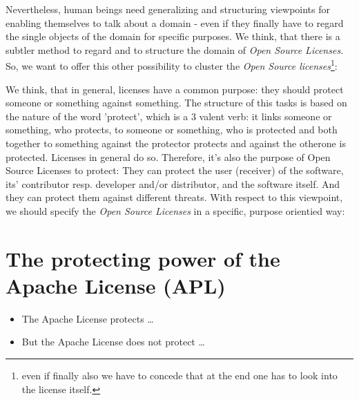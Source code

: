 Nevertheless, human beings need generalizing and structuring viewpoints for
enabling themselves to talk about a domain - even if they finally have to regard
the single objects of the domain for specific purposes. We think, that there is
a subtler method to regard and to structure the domain of \emph{Open Source
Licenses}. So, we want to offer this other possibility to cluster the \emph{Open
Source licenses}\footnote{even if finally also we have to concede that at the
end one has to look into the license itself.}:

We think, that in general, licenses have a common purpose: they should protect
someone or something against something. The structure of this tasks is based on
the nature of the word 'protect', which is a 3 valent verb: it links someone or
something, who protects, to someone or something, who is protected and both
together to something against the protector protects and against the otherone is
protected. Licenses in general do so. Therefore, it's also the purpose of Open
Source Licenses to protect: They can protect the user (receiver) of the
software, its' contributor resp. developer and/or distributor, and the software
itself. And they can protect them against different threats. With respect to
this viewpoint, we should specify the \emph{Open Source Licenses} in a specific,
purpose orientied way:

\section{The protecting power of the Apache License (APL)}
\begin{itemize} 
  \item The Apache License protects \ldots
  \item But the Apache License does not protect \ldots
\end{itemize}

